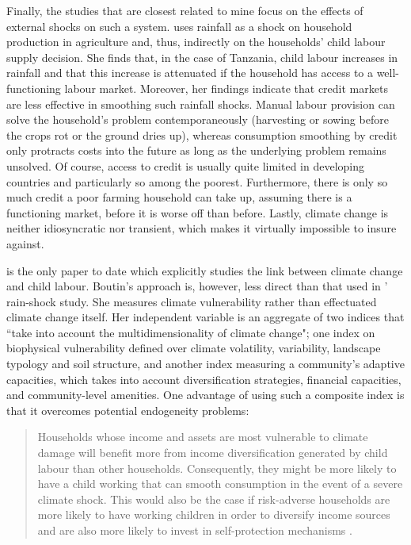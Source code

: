\documentclass[a4paper,12pt]{article}
\theoremstyle{plain}
\theoremstyle{definition}
\theoremstyle{definition}
\theoremstyle{definition}
\theoremstyle{definition}
\begin{document}
Finally, the studies that are closest related to mine focus on the effects of external shocks on such a system. \citet{Dumas2015,Dumas2020} uses rainfall as a shock on household production in agriculture and, thus, indirectly on the households' child labour supply decision. She finds that, in the case of Tanzania, child labour increases in rainfall and that this increase is attenuated if the household has access to a well-functioning labour market. Moreover, her findings indicate that credit markets are less effective in smoothing such rainfall shocks. Manual labour provision can solve the household's problem contemporaneously (harvesting or sowing before the crops rot or the ground dries up), whereas consumption smoothing by credit only protracts costs into the future as long as the underlying problem remains unsolved. Of course, access to credit is usually quite limited in developing countries and particularly so among the poorest. Furthermore, there is only so much credit a poor farming household can take up, assuming there is a functioning market, before it is worse off than before. Lastly, climate change is neither idiosyncratic nor transient, which makes it virtually impossible to insure against.  

\citet{Boutin2014} is the only paper to date which explicitly studies the link between climate change and child labour. Boutin's approach is, however, less direct than that used in \citeauthor{Dumas2020}' rain-shock study. She measures climate vulnerability rather than effectuated climate change itself. Her independent variable is an aggregate of two indices that ``take into account the multidimensionality of climate change"; one index on biophysical vulnerability defined over climate volatility, variability, landscape typology and soil structure, and another index measuring a community's adaptive capacities, which takes into account diversification strategies, financial capacities, and community-level amenities. One advantage of using such a composite index is that it overcomes potential endogeneity problems:

\begin{quote}
Households whose income and assets are most vulnerable to climate damage will benefit more from income diversification generated by child labour than other households. Consequently, they might be more likely to have a child working that can smooth consumption in the event of a severe climate shock. This would also be the case if risk-adverse households are more likely to have working children in order to diversify income sources and are also more likely to invest in self-protection mechanisms \citep[][p.5]{Boutin2014}.
\end{quote}
\end{document}
